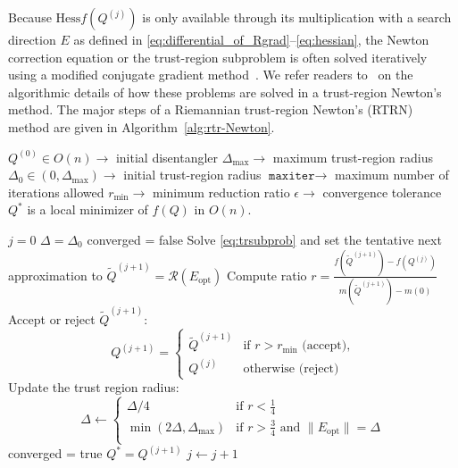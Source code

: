 \documentclass[pdflatex,sn-mathphys-num]{sn-jnl}
\newcounter{thm}[section]
\begin{document}
Because $\textrm{Hess} f(Q^{(j)})$ is only available through its multiplication with a search direction $E$ as defined in \eqref{eq:differential_of_Rgrad}--\eqref{eq:hessian}, the Newton correction equation or the trust-region subproblem is often solved iteratively using a modified conjugate gradient method~\cite{steihaug_cg}. We refer readers to~\cite{boumal2023introduction} on the algorithmic details of how these problems are solved in a trust-region Newton's method. The major steps of a Riemannian trust-region Newton's (RTRN) method are given in Algorithm~\ref{alg:rtr-Newton}.
%
\begin{algorithm}[htbp] \label{alg:rtr-Newton}
 \caption{A Riemannian trust-region Newton (RTRN) algorithm.} 
\begin{algorithmic}[1]
\Require 
\Statex $Q^{(0)} \in O(n) \rightarrow$ initial disentangler
\Statex $\Delta_{\max} \rightarrow$ maximum trust-region radius 
\Statex $\Delta_0 \in (0,\Delta_{\max}) \rightarrow$ initial trust-region radius 
\Statex $\texttt{maxiter} \rightarrow$ maximum number of iterations allowed 
\Statex $r_{\min} \rightarrow$ minimum reduction ratio 
\Statex $\epsilon \rightarrow$ convergence tolerance 
%
\Ensure $Q^*$ is a local minimizer of $f(Q)$ in $O(n)$.

\State $j=0$
\State $\Delta = \Delta_0$
\State converged = false
   \State Solve \eqref{eq:trsubprob} and set the tentative next approximation to $\tilde{Q}^{(j+1)} = \mathcal{R}(E_{\textrm{opt}})$
   \State Compute ratio $r = \frac{f(\tilde{Q}^{(j+1)})-f(Q^{(j)})}{m(\tilde{Q}^{(j+1)})-m(0)}$
   \State Accept or reject $\tilde{Q}^{(j+1)}$:
   \[
   Q^{(j+1)} = \left\{ \begin{array}{ll}
   \tilde{Q}^{(j+1)} & \mbox{if $r > r_{\min}$ (accept),} \\
   Q^{(j)} & \mbox{otherwise (reject)}
   \end{array}
   \right.
   \]
   \State Update the trust region radius:
   \[
   \Delta \leftarrow \left\{ \begin{array}{ll}
   \Delta/4 & \mbox{if $r < \frac{1}{4}$}  \\
   \min(2\Delta,\Delta_{\max}) & \mbox{if $r > \frac{3}{4}$ and $\|E_{\textrm{opt}}\| = \Delta$} \\
   \end{array}
   \right.
   \]
      \State converged = true
      \State $Q^* = Q^{(j+1)}$
   \EndIf
\State $j \leftarrow j + 1$
\EndWhile
\end{algorithmic}
\end{algorithm}
\end{document}
